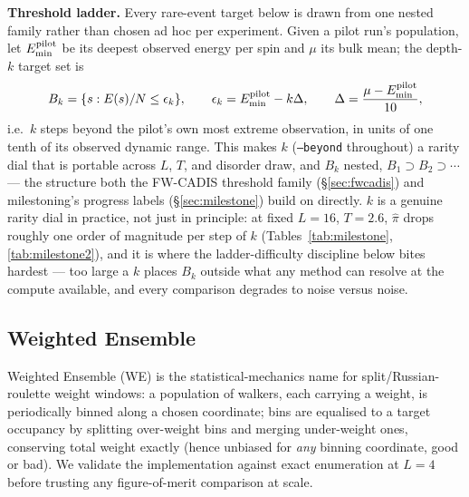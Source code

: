 \documentclass[a4paper,fleqn]{cas-sc}
\begin{document}
\textbf{Threshold ladder.} Every rare-event target below is drawn from one nested family
rather than chosen ad hoc per experiment. Given a pilot run's population, let
$E^{\rm pilot}_{\min}$ be its deepest observed energy per spin and $\mu$ its bulk mean; the
depth-$k$ target set is
\begin{equation}
	B_k=\{s: E(s)/N\le\epsilon_k\},\qquad
	\epsilon_k=E^{\rm pilot}_{\min}-k\Delta,\qquad
	\Delta=\frac{\mu-E^{\rm pilot}_{\min}}{10},
	\label{eq:beyond}
\end{equation}
i.e.\ $k$ steps beyond the pilot's own most extreme observation, in units of one tenth of
its observed dynamic range. This makes $k$ (\texttt{--beyond} throughout) a rarity dial
that is portable across $L$, $T$, and disorder draw, and $B_k$ nested,
$B_1\supset B_2\supset\cdots$ --- the structure both the FW-CADIS threshold family
(\S\ref{sec:fwcadis}) and milestoning's progress labels (\S\ref{sec:milestone}) build on
directly. $k$ is a genuine rarity dial in practice, not just in principle: at fixed $L=16$,
$T=2.6$, $\hat\pi$ drops roughly one order of magnitude per step of $k$
(Tables~\ref{tab:milestone}, \ref{tab:milestone2}), and it is where the ladder-difficulty
discipline below bites hardest --- too large a $k$ places $B_k$ outside what any method can
resolve at the compute available, and every comparison degrades to noise versus noise.

\subsection{Weighted Ensemble}
Weighted Ensemble (WE) is the statistical-mechanics name for split/Russian-roulette weight
windows: a population of walkers, each carrying a weight, is periodically binned along a
chosen coordinate; bins are equalised to a target occupancy by splitting over-weight bins
and merging under-weight ones, conserving total weight exactly (hence unbiased for
\emph{any} binning coordinate, good or bad). We validate the implementation against exact
enumeration at $L=4$ before trusting any figure-of-merit comparison at scale.
\end{document}

